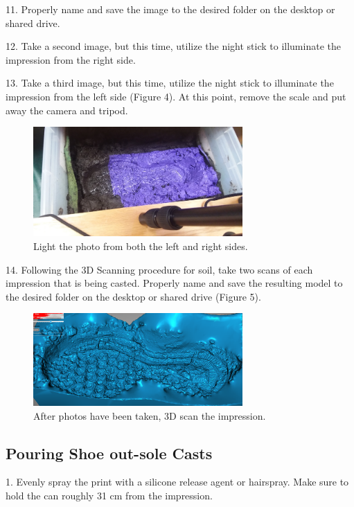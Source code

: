 11. Properly name and save the image to the desired folder on the desktop or shared drive. 

12. Take a second image, but this time, utilize the night stick to illuminate the impression from the right side. 

13. Take a third image, but this time, utilize the night stick to illuminate the impression from the left side (Figure 4). At this point, remove the scale and put away the camera and tripod.  

\begin{figure}[!htp]
\centering
\includegraphics[width=8cm]{BoardScan}
\caption{Light the photo from both the left and right sides.}
\label{Image 4}
\end{figure}

\newpage

14. Following the 3D Scanning procedure for soil, take two scans of each impression that is being casted. Properly name and save the resulting model to the desired folder on the desktop or shared drive (Figure 5). 

\begin{figure}[!htp]
\centering
\includegraphics[width=8cm]{Capture3}
\caption{After photos have been taken, 3D scan the impression. }
\label{Image 5}
\end{figure}

\subsection{Pouring Shoe out-sole Casts}

1. Evenly spray the print with a silicone release agent or hairspray. Make sure to hold the can roughly 31 cm from the impression. 

